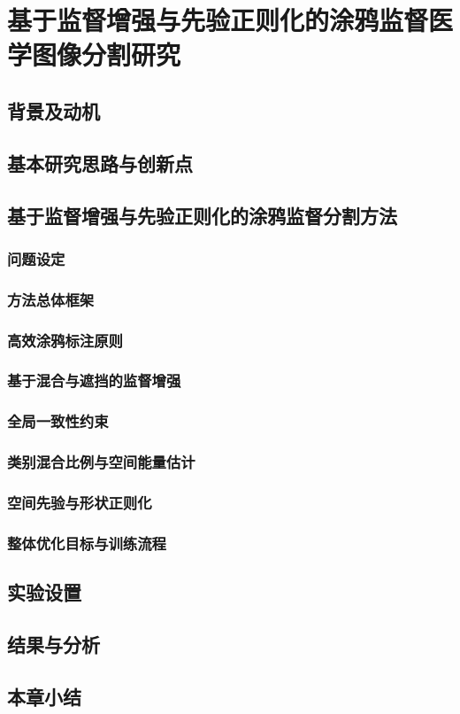 \chapter{基于监督增强与先验正则化的涂鸦监督医学图像分割研究}
\label{chap:zscribble}

\section{背景及动机}
\section{基本研究思路与创新点}
\section{基于监督增强与先验正则化的涂鸦监督分割方法}
\subsection{问题设定}
\subsection{方法总体框架}
\subsection{高效涂鸦标注原则}
\subsection{基于混合与遮挡的监督增强}
\subsection{全局一致性约束}
\subsection{类别混合比例与空间能量估计}
\subsection{空间先验与形状正则化}
\subsection{整体优化目标与训练流程}
\section{实验设置}
\section{结果与分析}
\section{本章小结}
